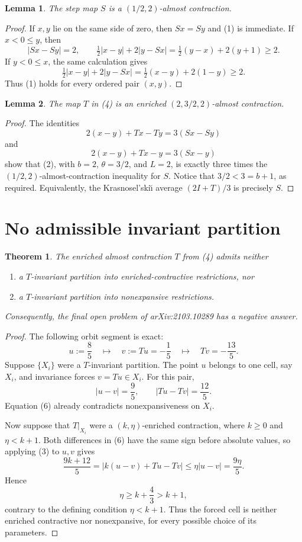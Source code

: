 \documentclass[11pt]{article}
\newtheorem{theorem}{Theorem}
\newtheorem{lemma}{Lemma}
\begin{document}
\begin{lemma}
The step map \(S\) is a \((1/2,2)\)-almost contraction.
\end{lemma}

\begin{proof}
If \(x,y\) lie on the same side of zero, then \(Sx=Sy\) and (1) is
immediate.  If \(x<0\le y\), then
\[
 |Sx-Sy|=2,\qquad
 \tfrac12|x-y|+2|y-Sx|
 =\tfrac12(y-x)+2(y+1)\ge2.
\]
If \(y<0\le x\), the same calculation gives
\[
 \tfrac12|x-y|+2|y-Sx|
 =\tfrac12(x-y)+2(1-y)\ge2.
\]
Thus (1) holds for every ordered pair \((x,y)\).
\end{proof}

\begin{lemma}
The map \(T\) in (4) is an enriched \((2,3/2,2)\)-almost contraction.
\end{lemma}

\begin{proof}
The identities
\[
 2(x-y)+Tx-Ty=3(Sx-Sy)
\]
and
\[
 2(x-y)+Tx-y=3(Sx-y)
\]
show that (2), with \(b=2\), \(\theta=3/2\), and \(L=2\), is exactly three
times the \((1/2,2)\)-almost-contraction inequality for \(S\).  Notice that
\(3/2<3=b+1\), as required.  Equivalently, the Krasnosel'ski\u\i{} average
\((2I+T)/3\) is precisely \(S\).
\end{proof}

\section{No admissible invariant partition}

\begin{theorem}
The enriched almost contraction \(T\) from (4) admits neither
\begin{enumerate}
\item a \(T\)-invariant partition into enriched-contractive restrictions, nor
\item a \(T\)-invariant partition into nonexpansive restrictions.
\end{enumerate}
Consequently, the final open problem of arXiv:2103.10289 has a negative
answer.
\end{theorem}

\begin{proof}
The following orbit segment is exact:
\[
 u:=\frac85
 \quad\longmapsto\quad
 v:=Tu=-\frac15
 \quad\longmapsto\quad
 Tv=-\frac{13}{5}.                                     \tag{5}
\]
Suppose \(\{X_i\}\) were a \(T\)-invariant partition.  The point \(u\)
belongs to one cell, say \(X_i\), and invariance forces \(v=Tu\in X_i\).
For this pair,
\[
 |u-v|=\frac95,\qquad |Tu-Tv|=\frac{12}{5}.             \tag{6}
\]
Equation (6) already contradicts nonexpansiveness on \(X_i\).

Now suppose that \(T|_{X_i}\) were a \((k,\eta)\)-enriched contraction,
where \(k\ge0\) and \(\eta<k+1\).  Both differences in (6) have the same
sign before absolute values, so applying (3) to \(u,v\) gives
\[
 \frac{9k+12}{5}
 =|k(u-v)+Tu-Tv|
 \le \eta|u-v|=\frac{9\eta}{5}.
\]
Hence
\[
 \eta\ge k+\frac43>k+1,
\]
contrary to the defining condition \(\eta<k+1\).  Thus the forced cell is
neither enriched contractive nor nonexpansive, for every possible choice of
its parameters.
\end{proof}
\end{document}
